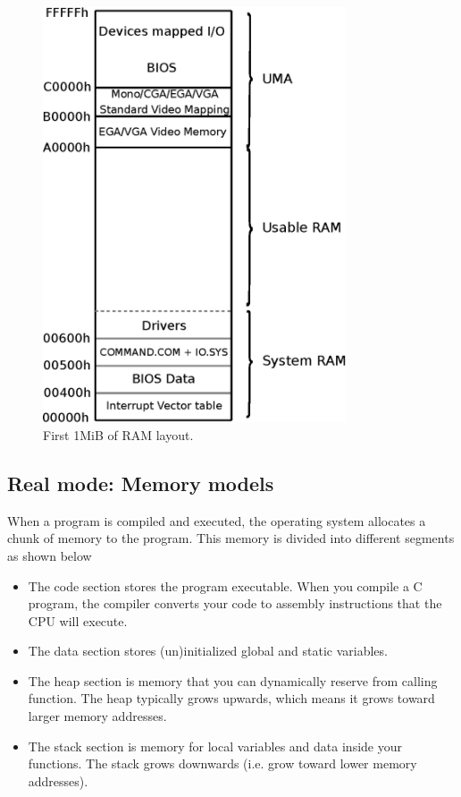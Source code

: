 \documentclass[book.tex]{subfiles}
\begin{document}
\par
\begin{figure}[H]
\centering
\includegraphics[width=0.8\textwidth]{imgs/drawings/real_mode_v2.eps}
\caption{First 1MiB of RAM layout.}
\label{fig:fp_internals}
\end{figure}
\pagebreak

\subsection{Real mode: Memory models}
When a program is compiled and executed, the operating system allocates a chunk of memory to the program. This memory is divided into different segments as shown below
\begin{itemize}
  \item The code section stores the program executable. When you compile a C program, the compiler converts your code to assembly instructions that the CPU will execute. 
  \item The data section stores (un)initialized global and static variables.
  \item The heap section is memory that you can dynamically reserve from calling  function. The heap typically grows upwards, which means it grows toward larger memory addresses.
  \item The stack section is memory for local variables and data inside your functions. The stack grows downwards (i.e. grow toward lower memory addresses).
\end{itemize}
\end{document}
